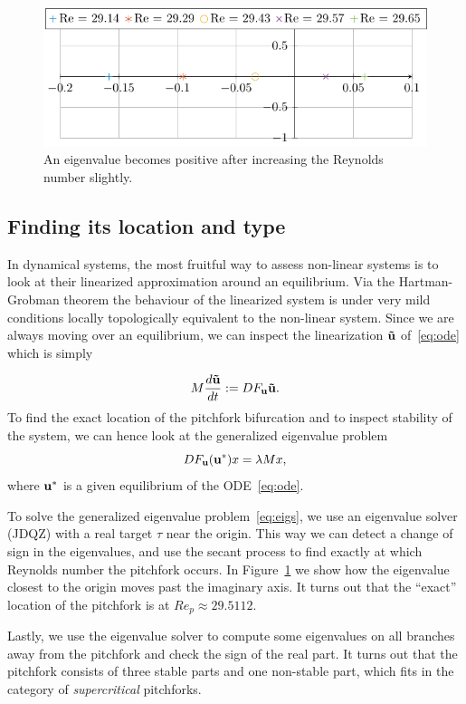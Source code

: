 \begin{figure}[p]
    \includegraphics[width=\textwidth]{images/eigenvalues.pdf}
    \caption{An eigenvalue becomes positive after increasing the Reynolds number slightly.}
    \label{fig:eigenvaluespitch}
\end{figure}

\newpage

\subsection{Finding its location and type}
In dynamical systems, the most fruitful way to assess non-linear systems is to look at their linearized approximation around an equilibrium. Via the Hartman-Grobman theorem the behaviour of the linearized system is under very mild conditions locally topologically equivalent to the non-linear system. Since we are always moving over an equilibrium, we can inspect the linearization $\mathbf{\tilde u}$ of~\eqref{eq:ode} which is simply

\begin{equation}
    M\frac{d \mathbf{\tilde u} }{d t} := DF_{\mathbf{u}}\mathbf{\tilde{u}}.
\end{equation}
To find the exact location of the pitchfork bifurcation and to inspect stability of the system, we can hence look at the generalized eigenvalue problem
\begin{equation}\label{eq:eigs}
    DF_{\mathbf{u}}(\mathbf{u}^*)x = \lambda M x,
\end{equation}
where $\mathbf{u}^*$ is a given equilibrium of the ODE~\eqref{eq:ode}.

To solve the generalized eigenvalue problem~\eqref{eq:eigs}, we use an eigenvalue solver (JDQZ) with a real target $\tau$ near the origin. This way we can detect a change of sign in the eigenvalues, and use the secant process to find exactly at which Reynolds number the pitchfork occurs. In Figure~\ref{fig:eigenvaluespitch} we show how the eigenvalue closest to the origin moves past the imaginary axis. It turns out that the ``exact'' location of the pitchfork is at $Re_p \approx 29.5112$.

Lastly, we use the eigenvalue solver to compute some eigenvalues on all branches away from the pitchfork and check the sign of the real part. It turns out that the pitchfork consists of three stable parts and one non-stable part, which fits in the category of {\em supercritical} pitchforks. 


